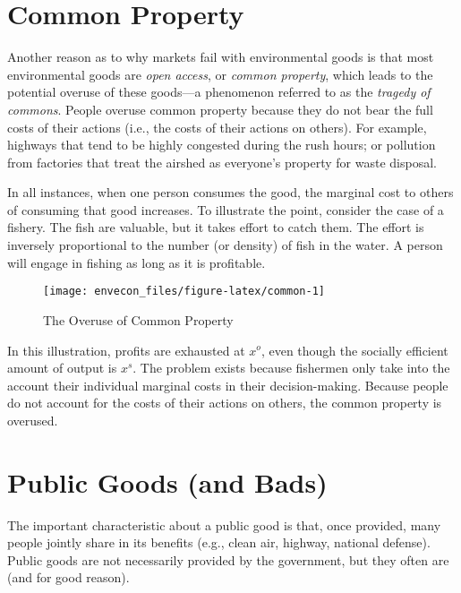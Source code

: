 \documentclass[
]{book}
\begin{document}
\hypertarget{common-property}{%
\section{Common Property}\label{common-property}}

Another reason as to why markets fail with environmental goods is that most environmental goods are \emph{open access}, or \emph{common property}, which leads to the potential overuse of these goods---a phenomenon referred to as the \emph{tragedy of commons}. People overuse common property because they do not bear the full costs of their actions (i.e., the costs of their actions on others). For example, highways that tend to be highly congested during the rush hours; or pollution from factories that treat the airshed as everyone's property for waste disposal.

In all instances, when one person consumes the good, the marginal cost to others of consuming that good increases. To illustrate the point, consider the case of a fishery. The fish are valuable, but it takes effort to catch them. The effort is inversely proportional to the number (or density) of fish in the water. A person will engage in fishing as long as it is profitable.

\begin{figure}

{\centering \texttt{[image: envecon\_files/figure-latex/common-1]} 

}

\caption{The Overuse of Common Property}\label{fig:common}
\end{figure}

In this illustration, profits are exhausted at \(x^o\), even though the socially efficient amount of output is \(x^s\). The problem exists because fishermen only take into the account their individual marginal costs in their decision-making. Because people do not account for the costs of their actions on others, the common property is overused.

\hypertarget{public-goods-and-bads}{%
\section{Public Goods (and Bads)}\label{public-goods-and-bads}}

The important characteristic about a public good is that, once provided, many people jointly share in its benefits (e.g., clean air, highway, national defense). Public goods are not necessarily provided by the government, but they often are (and for good reason).
\end{document}

